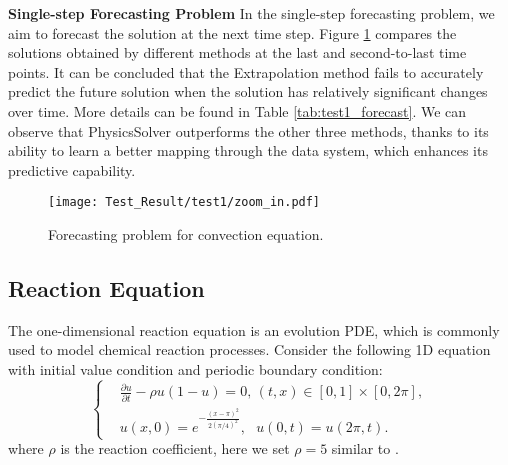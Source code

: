\documentclass[preprint,11pt]{elsarticle}
\begin{document}
\textbf{Single-step Forecasting Problem }
In the single-step forecasting problem, we aim to forecast the solution at the next time step. Figure \ref{fig:forecast_test1} compares the solutions obtained by different methods at the last and second-to-last time points. It can be concluded that the Extrapolation method fails to accurately predict the future solution when the solution has relatively significant changes over time. More details can be found in Table \ref{tab:test1_forecast}. We can observe that PhysicsSolver outperforms the other three methods, thanks to its ability to learn a better mapping through the data system, which enhances its predictive capability.
\begin{figure}[H]
\centering
\hspace*{-0.9cm}  
\texttt{[image: Test\_Result/test1/zoom\_in.pdf]}
\caption{Forecasting problem for convection equation.}
\label{fig:forecast_test1}
\end{figure}

\begin{table}[H]
\vspace{-15pt}
    
	\vskip 0.1in
	\centering
	\begin{small}
		\begin{sc}
			\renewcommand{\multirowsetup}{\centering}
			\setlength{\tabcolsep}{5.5pt}
		\end{sc}
	\end{small}
    \caption{Relative $l^2$ errors.}
	\label{tab:test1_forecast}
\end{table}

\subsection{Reaction Equation}
The one-dimensional reaction equation is an evolution PDE, which is commonly used to model chemical reaction processes. Consider the following  1D equation with  initial value condition and periodic boundary condition: 
\begin{equation}\left\{
\begin{aligned}
    &\frac{\partial u}{\partial t} - \rho u(1-u) = 0,\,(t,x)\in [0,1]\times [0,2\pi],\\
     &u(x,0)=e^{-\frac{(x-\pi)^2}{2(\pi/4)^2}}, \:\:\: u(0,t)=u(2\pi,t).
    \end{aligned}\right.
\end{equation}
where $\rho$ is the reaction coefficient, here we set $\rho=5$ similar to \cite{zhao2023pinnsformer}.
\end{document}
